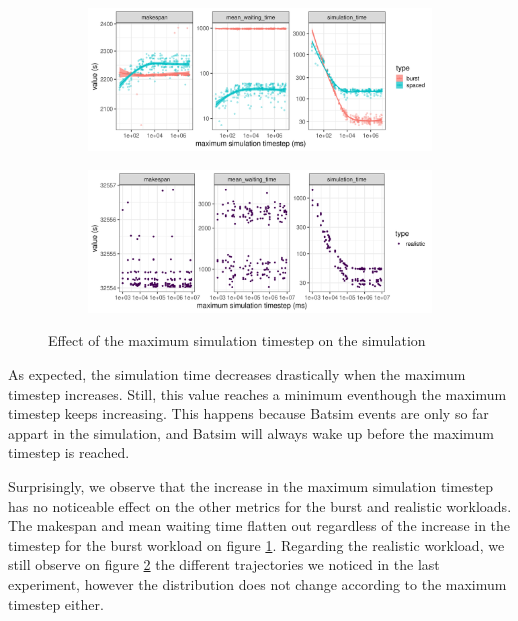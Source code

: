 \begin{figure}
	\begin{subfigure}{\textwidth}
		\centering
		\includegraphics[width=\textwidth]{imgs/max-timestep_burst_sp.png}
		\caption{}
		\label{fig:timestep_burst_sp}
	\end{subfigure}

	\begin{subfigure}{\textwidth}
		\centering
		\includegraphics[width=\textwidth]{imgs/max-timestep_realistic.png}
		\caption{}
		\label{fig:timestep_real}
	\end{subfigure}

	\caption{Effect of the maximum simulation timestep on the simulation}
	\label{fig:timestep}
\end{figure}

As expected, the simulation time decreases drastically when the maximum
timestep increases. Still, this value reaches a minimum eventhough the maximum
timestep keeps increasing. This happens because Batsim events are only so far
appart in the simulation, and Batsim will always wake up before the maximum
timestep is reached.

Surprisingly, we observe that the increase in the maximum simulation timestep
has no noticeable effect on the other metrics for the burst and realistic
workloads. The makespan and mean waiting time flatten out regardless of the
increase in the timestep for the burst workload on figure
\ref{fig:timestep_burst_sp}. Regarding the realistic workload, we still observe
on figure \ref{fig:timestep_real} the different trajectories we noticed in the
last experiment, however the distribution does not change according to the
maximum timestep either.

